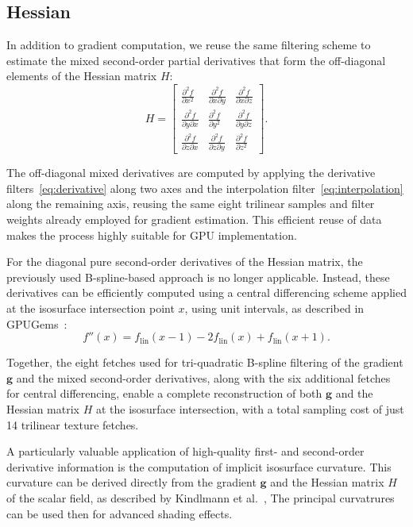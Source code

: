 \documentclass[conference]{IEEEtran}
\begin{document}
\subsection{Hessian}

In addition to gradient computation, we reuse the same filtering scheme to estimate the mixed second-order partial derivatives that form the off-diagonal elements of the Hessian matrix $H$:
\begin{equation}
H =
\begin{bmatrix}
\frac{\partial^2 f}{\partial x^2} & \frac{\partial^2 f}{\partial x \partial y} & \frac{\partial^2 f}{\partial x \partial z} \\
\frac{\partial^2 f}{\partial y \partial x} & \frac{\partial^2 f}{\partial y^2} & \frac{\partial^2 f}{\partial y \partial z} \\
\frac{\partial^2 f}{\partial z \partial x} & \frac{\partial^2 f}{\partial z \partial y} & \frac{\partial^2 f}{\partial z^2}
\end{bmatrix}.
\end{equation}

The off-diagonal mixed derivatives are computed by applying the derivative filters~\eqref{eq:derivative} along two axes and the interpolation filter~\eqref{eq:interpolation} along the remaining axis, reusing the same eight trilinear samples and filter weights already employed for gradient estimation. This efficient reuse of data makes the process highly suitable for GPU implementation.

For the diagonal pure second-order derivatives of the Hessian matrix, the previously used B-spline-based approach is no longer applicable. Instead, these derivatives can be efficiently computed using a central differencing scheme applied at the isosurface intersection point $x$, using unit intervals, as described in GPUGems~\cite{engel2005gpugems2}:
\begin{equation}
f''(x) = f_{\text{lin}}(x - 1) - 2f_{\text{lin}}(x) + f_{\text{lin}}(x + 1).
\end{equation}

Together, the eight fetches used for tri-quadratic B-spline filtering of the gradient $\mathbf{g}$ and the mixed second-order derivatives, along with the six additional fetches for central differencing, enable a complete reconstruction of both $\mathbf{g}$ and the Hessian matrix $H$ at the isosurface intersection, with a total sampling cost of just 14 trilinear texture fetches.

A particularly valuable application of high-quality first- and second-order derivative information is the computation of implicit isosurface curvature. This curvature can be derived directly from the gradient $\mathbf{g}$ and the Hessian matrix $H$ of the scalar field, as described by Kindlmann et al.~\cite{kindlmann2003curvature}, The principal curvatrures can be used then for advanced shading effects.
\end{document}
